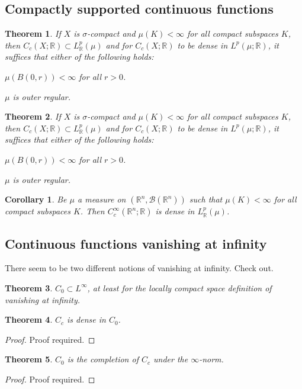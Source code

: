 \documentclass[11pt, a4paper, openany]{book}
\newtheorem{thm}{Theorem}\newtheorem{lem}{Lemma}\newtheorem{crl}{Corollary}
\theoremstyle{definition}
\newcommand{\ph}{\underline{\hspace{0.3cm}}}
\newenvironment{tight_enumerate}{\begin{enumerate}\itemsep -0.2em}{\end{enumerate}}
\begin{document}
\subsection{Compactly supported continuous functions}
    \begin{thm}
        If $X$ is $\sigma$-compact and $\mu(K)<\infty$ for all compact subspaces $K$, then $C_c(X;\mathbb{R})\subset L^p_\mathbb{R}(\mu)$ and for $C_c(X;\mathbb{R})$ to be dense in $L^p(\mu;\mathbb{R})$, it suffices that either of the following holds:
        \begin{tight_enumerate}
            \item $\mu(B(0,r))<\infty$ for all $r>0$.
            \item $\mu$ is outer regular.
        \end{tight_enumerate}
    \end{thm}
    \begin{thm}
        If $X$ is $\sigma$-compact and $\mu(K)<\infty$ for all compact subspaces $K$, then $C_c(X;\mathbb{R})\subset L^p_\mathbb{R}(\mu)$ and for $C_c(X;\mathbb{R})$ to be dense in $L^p(\mu;\mathbb{R})$, it suffices that either of the following holds:
        \begin{tight_enumerate}
            \item $\mu(B(0,r))<\infty$ for all $r>0$.
            \item $\mu$ is outer regular.
        \end{tight_enumerate}
    \end{thm}
    \begin{crl}
        Be $\mu$ a measure on $(\mathbb{R}^n,\mathscr{B}(\mathbb{R}^n))$ such that $\mu(K)<\infty$ for all compact subspaces $K$. Then $C^\infty_c(\mathbb{R}^n;\mathbb{R})$ is dense in $L^p_\mathbb{R}(\mu)$.
    \end{crl}
\subsection{Continuous functions vanishing at infinity}
    There seem to be two different notions of vanishing at infinity. Check out.
    \begin{thm}
        $C_0\subset L^\infty$, at least for the locally compact space definition of vanishing at infinity.
    \end{thm}
    \begin{thm}
        $C_c$ is dense in $C_0$.
    \end{thm}
    \begin{proof}
        Proof required.
    \end{proof}
    \begin{thm}
        $C_0$ is the completion of $C_c$ under the $\infty$-norm. %
    \end{thm}
    \begin{proof}
        Proof required.
    \end{proof}
\end{document}
